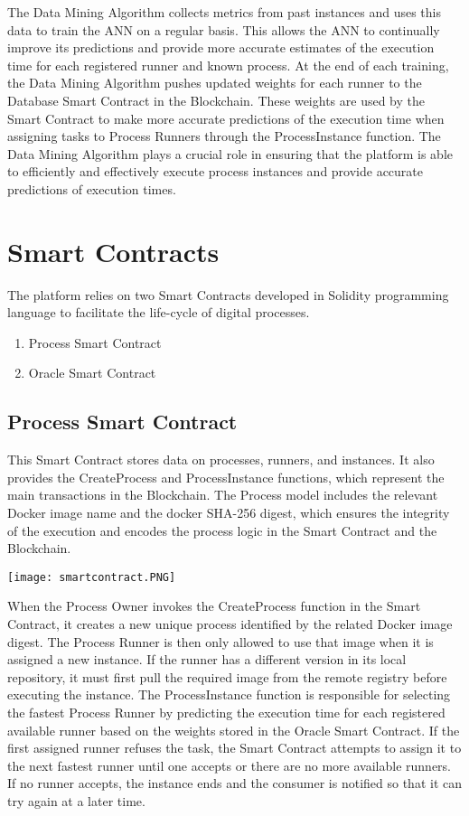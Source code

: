 \documentclass[10pt,a4paper]{report}
\begin{document}
\large\justify The Data Mining Algorithm collects metrics from past instances and uses this data to train the ANN on a regular basis. This allows the ANN to continually improve its predictions and provide more accurate estimates of the execution time for each registered runner and known process. At the end of each training, the Data Mining Algorithm pushes updated weights for each runner to the Database Smart Contract in the Blockchain. These weights are used by the Smart Contract to make more accurate predictions of the execution time when assigning tasks to Process Runners through the ProcessInstance function. The Data Mining Algorithm plays a crucial role in ensuring that the platform is able to efficiently and effectively execute process instances and provide accurate predictions of execution times.

\section{Smart Contracts}
\large\justify The platform relies on two Smart Contracts developed in Solidity programming language to facilitate the life-cycle of digital processes.
\begin{enumerate}
    \item Process Smart Contract
    \item Oracle Smart Contract
\end{enumerate}

\subsection{Process Smart Contract}
\large \justify This Smart Contract stores data on processes, runners, and instances. It also provides the CreateProcess and ProcessInstance functions, which represent the main transactions in the Blockchain. The Process model includes the relevant Docker image name and the docker SHA-256 digest, which ensures the integrity of the execution and encodes the process logic in the Smart Contract and the Blockchain.

\begin{center}
    \texttt{[image: smartcontract.PNG]}
\end{center}

\large\justify When the Process Owner invokes the CreateProcess function in the Smart Contract, it creates a new unique process identified by the related Docker image digest. The Process Runner is then only allowed to use that image when it is assigned a new instance. If the runner has a different version in its local repository, it must first pull the required image from the remote registry before executing the instance. The ProcessInstance function is responsible for selecting the fastest Process Runner by predicting the execution time for each registered available runner based on the weights stored in the Oracle Smart Contract. If the first assigned runner refuses the task, the Smart Contract attempts to assign it to the next fastest runner until one accepts or there are no more available runners. If no runner accepts, the instance ends and the consumer is notified so that it can try again at a later time.
\end{document}
